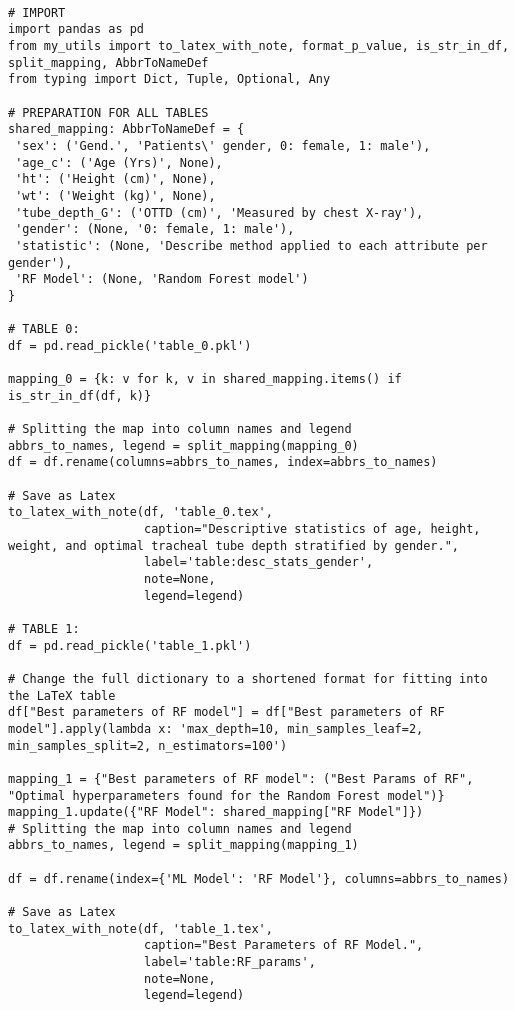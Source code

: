 \documentclass[11pt]{article}
\begin{document}
\begin{verbatim}

# IMPORT
import pandas as pd
from my_utils import to_latex_with_note, format_p_value, is_str_in_df, split_mapping, AbbrToNameDef
from typing import Dict, Tuple, Optional, Any

# PREPARATION FOR ALL TABLES
shared_mapping: AbbrToNameDef = {
 'sex': ('Gend.', 'Patients\' gender, 0: female, 1: male'),
 'age_c': ('Age (Yrs)', None),
 'ht': ('Height (cm)', None),
 'wt': ('Weight (kg)', None),
 'tube_depth_G': ('OTTD (cm)', 'Measured by chest X-ray'),
 'gender': (None, '0: female, 1: male'),
 'statistic': (None, 'Describe method applied to each attribute per gender'),
 'RF Model': (None, 'Random Forest model')
}

# TABLE 0:
df = pd.read_pickle('table_0.pkl')

mapping_0 = {k: v for k, v in shared_mapping.items() if is_str_in_df(df, k)}

# Splitting the map into column names and legend
abbrs_to_names, legend = split_mapping(mapping_0)
df = df.rename(columns=abbrs_to_names, index=abbrs_to_names)

# Save as Latex
to_latex_with_note(df, 'table_0.tex',
                   caption="Descriptive statistics of age, height, weight, and optimal tracheal tube depth stratified by gender.", 
                   label='table:desc_stats_gender',
                   note=None,
                   legend=legend)

# TABLE 1:
df = pd.read_pickle('table_1.pkl')

# Change the full dictionary to a shortened format for fitting into the LaTeX table
df["Best parameters of RF model"] = df["Best parameters of RF model"].apply(lambda x: 'max_depth=10, min_samples_leaf=2, min_samples_split=2, n_estimators=100')

mapping_1 = {"Best parameters of RF model": ("Best Params of RF", "Optimal hyperparameters found for the Random Forest model")}
mapping_1.update({"RF Model": shared_mapping["RF Model"]})
# Splitting the map into column names and legend
abbrs_to_names, legend = split_mapping(mapping_1)

df = df.rename(index={'ML Model': 'RF Model'}, columns=abbrs_to_names)

# Save as Latex
to_latex_with_note(df, 'table_1.tex',
                   caption="Best Parameters of RF Model.", 
                   label='table:RF_params',
                   note=None,
                   legend=legend)


\end{verbatim}
\end{document}
